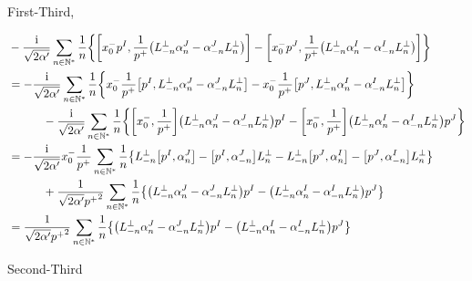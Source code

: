 First-Third,

\begin{align*}
    &-\frac{\im}{\sqrt{2\alpha'}}\sum\limits_{n\in\mathbb N^\ast}\frac1n\qty{\comm{x_0^-p^I}{\frac{1}{p^+}\qty(L^\perp_{-n}\alpha_n^J-\alpha_{-n}^JL^\perp_{n})}-\comm{x_0^-p^J}{\frac{1}{p^+}\qty(L^\perp_{-n}\alpha_n^I-\alpha_{-n}^IL^\perp_{n})}}\\
    &=-\frac{\im}{\sqrt{2\alpha'}}\sum\limits_{n\in\mathbb N^\ast}\frac1n\qty{x_0^-\frac{1}{p^+}\comm{p^I}{L^\perp_{-n}\alpha_n^J-\alpha_{-n}^JL^\perp_{n}}-x_0^-\frac{1}{p^+}\comm{p^J}{L^\perp_{-n}\alpha_n^I-\alpha_{-n}^IL^\perp_{n}}}\\
    &\quad\quad\quad-\frac{\im}{\sqrt{2\alpha'}}\sum\limits_{n\in\mathbb N^\ast}\frac1n\qty{\comm{x_0^-}{\frac{1}{p^+}}\qty(L^\perp_{-n}\alpha_n^J-\alpha_{-n}^JL^\perp_{n})p^I-\comm{x_0^-}{\frac{1}{p^+}}\qty(L^\perp_{-n}\alpha_n^I-\alpha_{-n}^IL^\perp_{n})p^J}\\
    &=-\frac{\im}{\sqrt{2\alpha'}}x_0^-\frac{1}{p^+}\sum\limits_{n\in\mathbb N^\ast}\frac1n\qty{L^\perp_{-n}\comm{p^I}{\alpha_n^J}-\comm{p^I}{\alpha_{-n}^J}L^\perp_{n}-L^\perp_{-n}\comm{p^J}{\alpha_n^I}-\comm{p^J}{\alpha_{-n}^I}L^\perp_{n}}\\
    &\quad\quad\quad+\frac{1}{\sqrt{2\alpha'}{p^+}^2}\sum\limits_{n\in\mathbb N^\ast}\frac1n\qty{\qty(L^\perp_{-n}\alpha_n^J-\alpha_{-n}^JL^\perp_{n})p^I-\qty(L^\perp_{-n}\alpha_n^I-\alpha_{-n}^IL^\perp_{n})p^J}\\
    &=\frac{1}{\sqrt{2\alpha'}{p^+}^2}\sum\limits_{n\in\mathbb N^\ast}\frac1n\qty{\qty(L^\perp_{-n}\alpha_n^J-\alpha_{-n}^JL^\perp_{n})p^I-\qty(L^\perp_{-n}\alpha_n^I-\alpha_{-n}^IL^\perp_{n})p^J}
\end{align*}

Second-Third

